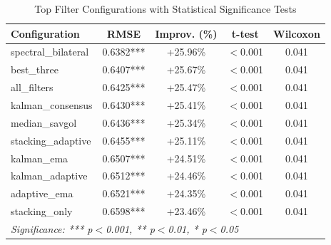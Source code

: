 \begin{table}[htbp]
\centering
\caption{Top Filter Configurations with Statistical Significance Tests}
\label{tab:statistical-significance}
\begin{tabular}{l|c|c|c|c}
\hline
\textbf{Configuration} & \textbf{RMSE} & \textbf{Improv. (\%)} & \textbf{t-test} & \textbf{Wilcoxon} \\
\hline
spectral\_bilateral & 0.6382*** & +25.96\% & $<$0.001 & 0.041 \\
best\_three & 0.6407*** & +25.67\% & $<$0.001 & 0.041 \\
all\_filters & 0.6425*** & +25.47\% & $<$0.001 & 0.041 \\
kalman\_consensus & 0.6430*** & +25.41\% & $<$0.001 & 0.041 \\
median\_savgol & 0.6436*** & +25.34\% & $<$0.001 & 0.041 \\
stacking\_adaptive & 0.6455*** & +25.11\% & $<$0.001 & 0.041 \\
kalman\_ema & 0.6507*** & +24.51\% & $<$0.001 & 0.041 \\
kalman\_adaptive & 0.6512*** & +24.46\% & $<$0.001 & 0.041 \\
adaptive\_ema & 0.6521*** & +24.35\% & $<$0.001 & 0.041 \\
stacking\_only & 0.6598*** & +23.46\% & $<$0.001 & 0.041 \\
\hline
\multicolumn{5}{l}{\textit{Significance: *** p$<$0.001, ** p$<$0.01, * p$<$0.05}} \\
\hline
\end{tabular}
\end{table}